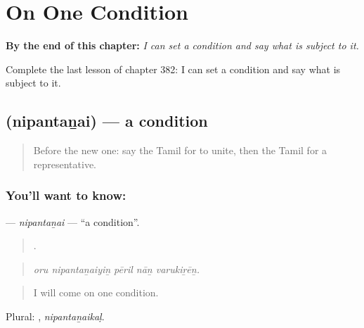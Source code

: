 
\chapter{On One Condition}
\label{ch:ta-on-one-condition}

\begin{chapteropening}
\textbf{By the end of this chapter:} \emph{I can set a condition and say what is subject to it.}

Complete the last lesson of chapter 382: I can set a condition and say what is subject to it.
\end{chapteropening}

\section[\texorpdfstring{\ta{நிபந்தனை} (nipantaṉai)}{நிபந்தனை (nipantaṉai)}]{ (nipantaṉai) — a condition}

\label{lesson:TA-C382-nipantanai}



\begin{quote}
Before the new one: say the Tamil for to unite, then the Tamil for a representative.
\end{quote}

\subsection*{You'll want to know: }
\textbf{} — \emph{nipantaṉai} — \textquotedblleft{}a condition\textquotedblright{}.

\begin{quote}
    .
\end{quote}

\begin{quote}
\emph{oru nipantaṉaiyiṉ pēril nāṉ varukiṟēṉ.}
\end{quote}

\begin{quote}
I will come on one condition.
\end{quote}

Plural: , \emph{nipantaṉaikaḷ}.

